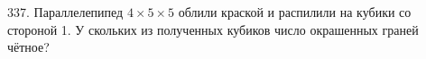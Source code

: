 337. Параллелепипед $4\times5\times5$ облили краской и распилили на кубики со стороной 1. У скольких из полученных кубиков число окрашенных граней чётное?\\
